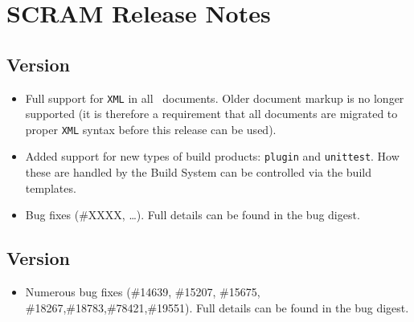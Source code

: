 \chapter{SCRAM Release Notes}\label{ch:releasenotes}

\section{Version \thisrelease}
\begin{itemize}
\item Full support for \texttt{XML} in all \scram\ documents. Older
  document markup is no longer supported (it is therefore a requirement
  that all documents are migrated to proper \texttt{XML} syntax before
  this release can be used).

\item Added support for new types of build products: \texttt{plugin} and
  \texttt{unittest}. How these are handled by the Build System can be
  controlled via the build templates.

\item Bug fixes (\#XXXX, \ldots). Full details can be found in the bug
  digest.

\end{itemize}


\section{Version \lastrelease}
\begin{itemize}
\item Numerous bug fixes (\#14639, \#15207, \#15675, \#18267,\#18783,\#78421,\#19551). Full details
  can be found in the bug digest.
  
\end{itemize}

